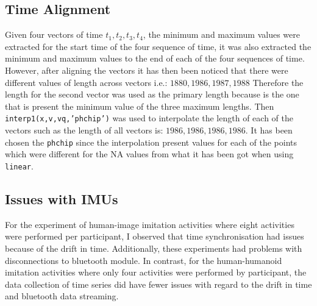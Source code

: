 \subsection{Time Alignment}
Given four vectors of time
$t_1, t_2, t_3, t_4$, the minimum and maximum values were extracted 
for the start time of the four sequence of time,
it was also extracted the minimum and maximum values to the
end of each of the four sequences of time.
However, after aligning the vectors it has then  been noticed that there were
different values of length across vectors i.e.: $1880,1986,1987,1988$
Therefore the length for the second vector was used as the primary length
because is the one that is present the minimum value of the three maximum
lengths. Then \texttt{interp1(x,v,vq,'phchip')}  was used to interpolate the
length of each of the vectors such as the length of all vectors is: 
$1986,1986,1986,1986$.
It has been chosen the \texttt{phchip} since the interpolation present
values for each of the points which were different for the NA values
from what it has been got when using \texttt{linear}.

\subsection{Issues with IMUs} \label{appendix:imus:issues}
For the experiment of human-image imitation activities where eight activities 
were performed per participant, I observed that time synchronisation had 
issues because of the drift in time. Additionally, these experiments
had problems with disconnections to bluetooth module. 
In contrast, for the human-humanoid imitation activities
where only four activities were performed by participant, the data collection
of time series did have fewer issues with regard to the drift in time 
and bluetooth data streaming.  

